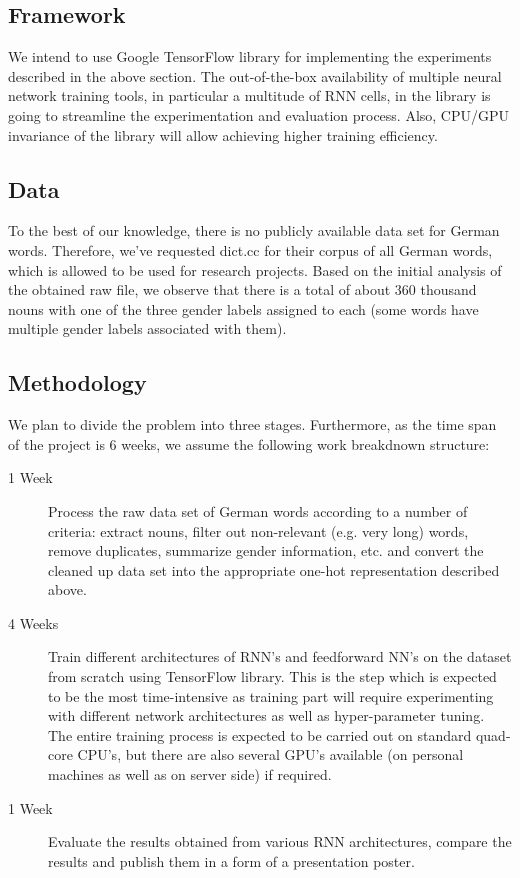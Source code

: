 \documentclass[10pt,twocolumn,letterpaper]{article}
\begin{document}
\subsection{Framework}
We intend to use Google TensorFlow library for implementing the experiments described in the above section. The out-of-the-box availability of multiple neural network training tools, in particular a multitude of RNN cells, in the library is going to streamline the experimentation and evaluation process. Also, CPU/GPU invariance of the library will allow achieving higher training efficiency.

\subsection{Data}
To the best of our knowledge, there is no publicly available data set for German words. Therefore, we've requested dict.cc for their corpus of all German words, which is allowed to be used for research projects. Based on the initial analysis of the obtained raw file, we observe that there is a total of about 360 thousand nouns with one of the three gender labels assigned to each (some words have multiple gender labels associated with them).
\subsection{Methodology}
We plan to divide the problem into three stages. Furthermore, as the time span of the project is 6 weeks, we assume the following work breakdnown structure:
\begin{description}
    \item [1 Week] Process the raw data set of German words according to a number of criteria: extract nouns, filter out non-relevant (e.g. very long) words, remove duplicates, summarize gender information, etc. and convert the cleaned up data set into the appropriate one-hot representation described above.
    \item [4 Weeks] Train different architectures of RNN's and feedforward NN's on the dataset from scratch using TensorFlow library. This is the step which is expected to be the most time-intensive as training part will require experimenting with different network architectures as well as hyper-parameter tuning. The entire training process is expected to be carried out on standard quad-core CPU's, but there are also several GPU's available (on personal machines as well as on server side) if required.
    \item [1 Week] Evaluate the results obtained from various RNN architectures, compare the results and publish them in a form of a presentation poster.
\end{description}
\end{document}
